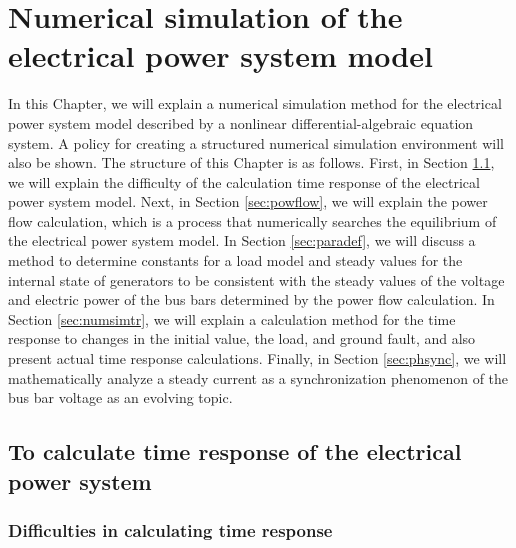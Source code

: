 \documentclass[tombow,dvipdfmx]{corona-a5-1.1}
\begin{document}
\chapter{Numerical simulation of the electrical power system model}\label{chap:numcal}

In this Chapter, we will explain a numerical simulation method for the electrical power system model described by a nonlinear differential-algebraic equation system.
A policy for creating a structured numerical simulation environment will also be shown.
The structure of this Chapter is as follows. First, in Section \ref{sec:howtocal}, we will explain the difficulty of the calculation time response of the electrical power system model.
Next, in Section \ref{sec:powflow}, we will explain the power flow calculation, which is a process that numerically searches the equilibrium of the electrical power system model.
In Section \ref{sec:paradef}, we will discuss a method to determine constants for a load model and steady values for the internal state of generators to be consistent with the steady values of the voltage and electric power of the bus bars determined by the power flow calculation. In Section \ref{sec:numsimtr}, we will explain a calculation method for the time response to changes in the initial value, the load, and ground fault, and also present actual time response calculations. Finally, in Section \ref{sec:phsync}, we will mathematically analyze a steady current as a synchronization phenomenon of the bus bar voltage as an evolving topic.

\section{To calculate time response of the electrical power system}\label{sec:howtocal}

\subsection{Difficulties in calculating time response}
\end{document}
